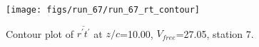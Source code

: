 \begin{figure}[H]
\centering
\texttt{[image: figs/run\_67/run\_67\_rt\_contour]}
\caption{Contour plot of $\overline{r^\prime t^\prime}$ at $z/c$=10.00, $V_{free}$=27.05, station 7.}
\end{figure}


